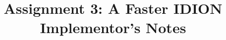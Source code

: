\documentclass[conference]{IEEEtran}
\begin{document}
\title{Assignment 3: A Faster IDION\\Implementor's Notes}
\author{
        }
\maketitle

\begin{abstract}
\end{abstract}
\end{document}
